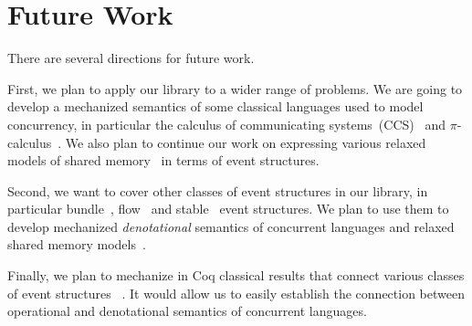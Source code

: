 \section{Future Work}

There are several directions for future work. 

First, we plan to apply our library to a wider range of problems. 
We are going to develop a mechanized semantics of some classical 
languages used to model concurrency, in particular 
the calculus of communicating systems~(CCS)~\cite{Milner:80} and 
$\pi$-calculus~\cite{Milner:99}.      
We also plan to continue our work on 
expressing various relaxed models 
of shared memory~\cite{Sewell-al:CACM10, Lahav-al:POPL16, Lahav-al:PLDI17, Podkopaev-al:POPL19}
in terms of event structures.  

Second, we want to cover other classes of event structures in our library, 
in particular bundle~\cite{Langerak:91}, flow~\cite{Boudol-Castellani:1991}
and stable~\cite{Winskel:82, Winskel:86} event structures.
We plan to use them to develop mechanized \emph{denotational} semantics 
of concurrent languages and relaxed shared memory models~\cite{Dodds-al:ESOP18}.  

Finally, we plan to mechanize in Coq classical results 
that connect various classes of event structures%
~\cite{Nielsen-al:1981, Boudol-Castellani:1991}. 
It would allow us to easily establish the connection between operational and denotational 
semantics of concurrent languages.
